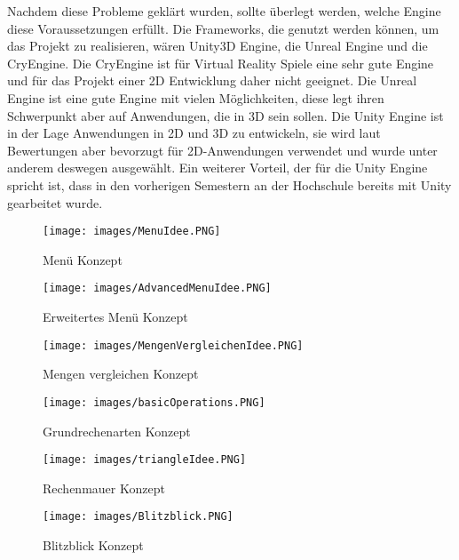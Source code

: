 Nachdem diese Probleme geklärt wurden, sollte überlegt werden, welche Engine diese Voraussetzungen erfüllt. Die Frameworks, die genutzt werden können, um das Projekt zu realisieren, wären Unity3D Engine, die Unreal Engine und die CryEngine. Die CryEngine ist für Virtual Reality Spiele eine sehr gute Engine und für das Projekt einer 2D Entwicklung daher nicht geeignet. Die Unreal Engine ist eine gute Engine mit vielen Möglichkeiten, diese legt ihren Schwerpunkt aber auf Anwendungen, die in 3D sein sollen. Die Unity Engine ist in der Lage Anwendungen in 2D und 3D zu entwickeln, sie wird laut Bewertungen aber bevorzugt für 2D-Anwendungen verwendet und wurde unter anderem deswegen ausgewählt. Ein weiterer Vorteil, der für die Unity Engine spricht ist, dass in den vorherigen Semestern an der Hochschule bereits mit Unity gearbeitet wurde.


\begin{figure}[htbp]
  \centering
  \texttt{[image: images/MenuIdee.PNG]}
  \caption{Menü Konzept}
  \label{MenuIdee}
\end{figure}

\begin{figure}[htbp]
  \centering
  \texttt{[image: images/AdvancedMenuIdee.PNG]}
  \caption{Erweitertes Menü Konzept}
  \label{MenuErweitertIdee}
\end{figure}

\begin{figure}[htbp]
  \centering
  \texttt{[image: images/MengenVergleichenIdee.PNG]}
  \caption{Mengen vergleichen Konzept}
  \label{MengenKonzept}
\end{figure}

\begin{figure}[htbp]
  \centering
  \texttt{[image: images/basicOperations.PNG]}
  \caption{Grundrechenarten Konzept}
  \label{GrundrechenartenKonzept}
\end{figure}

\begin{figure}[htbp]
  \centering
  \texttt{[image: images/triangleIdee.PNG]}
  \caption{Rechenmauer Konzept}
  \label{RechenmauerKonzept}
\end{figure}

\begin{figure}[htbp]
  \centering
  \texttt{[image: images/Blitzblick.PNG]}
  \caption{Blitzblick Konzept}
  \label{BlitzblickKonzept}
\end{figure}

